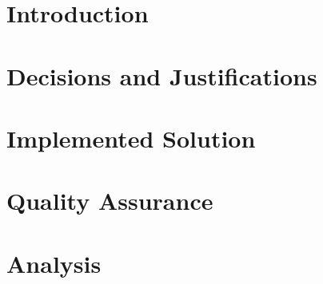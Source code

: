 \documentclass[11pt,a4paper]{book}
\begin{document}
\newtheorem{defn}{Definition}

\setlength{\parindent}{0pt}

\sloppy

\frontmatter



\tableofcontents

\setlength{\parskip}{6pt}






\mainmatter
\part{Introduction}








\part{Decisions and Justifications}






\part{Implemented Solution}










\part{Quality Assurance}




\part{Analysis}






\end{document}
